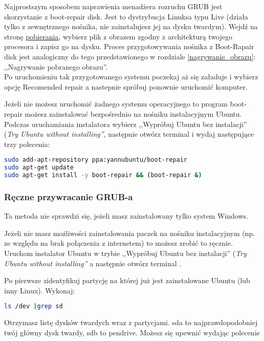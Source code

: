 Najprostszym sposobem naprawienia menadżera rozruchu GRUB jest skorzystanie z boot-repair disk. Jest to dystrybucja Linuksa typu Live (działa tylko z zewnętrznego nośnika, nie zainstalujesz jej na dysku twardym). Wejdź na stronę \href{http://sourceforge.net/projects/boot-repair-cd/files/}{pobierania}, wybierz plik z obrazem zgodny z architekturą twojego procesora i zapisz go na dysku. Proces przygotowywania nośnika z Boot-Rapair disk jest analogiczny do tego przedstawionego w rozdziale \ref{nagrywanie_obrazu}: ,,Nagrywanie pobranego obrazu''.\\
Po uruchomieniu tak przygotowanego systemu poczekaj aż się załaduje i wybierz opcję \textcolor{ubuntu_orange}{Recomended repair} a nastepnie spróbuj ponownie uruchomić komputer.

Jeżeli nie możesz uruchomić żadnego systemu operacyjnego to program boot-repair możesz zainstalować bezpośrednio na nośniku instalacyjnym Ubuntu. Podczas uruchamiania instalatora wybierz ,,Wypróbuj Ubuntu bez instalacji'' (\textit{Try Ubuntu without installing''}, następnie otwórz terminal  i wydaj następujące trzy polecenia:

\begin{lstlisting}[language=bash]
sudo add-apt-repository ppa:yannubuntu/boot-repair
sudo apt-get update
sudo apt-get install -y boot-repair && (boot-repair &)
\end{lstlisting}

\subsubsection{Ręczne przywracanie GRUB-a}
Ta metoda nie sprawdzi się, jeżeli masz zainstalowany tylko system Windows.

Jeżeli nie masz możliwości zainstalowania paczek na nośniku instalacyjnym (np. ze względu na brak połączenia z internetem) to możesz zrobić to ręcznie. Uruchom instalator Ubuntu w trybie ,,Wypróbuj Ubuntu bez instalacji'' (\textit{Try Ubuntu without installing''} a następnie otwórz terminal .

Po pierwsze zidentyfikuj partycję na której już jest zainstalowane Ubuntu (lub inny Linux). Wykonaj:

\begin{lstlisting}[language=bash]
ls /dev |grep sd
\end{lstlisting}

Otrzymasz listę dysków twardych wraz z partycjami. \textcolor{ubuntu_orange}{sda} to najprawdopodobniej twój główny dysk twardy, sdb to pendrive. Możesz się upewnić wydając polecenie

